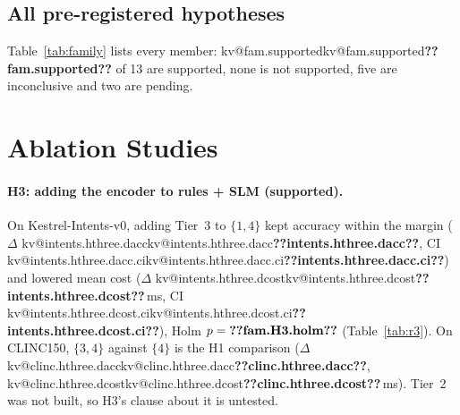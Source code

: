 \documentclass[11pt,a4paper]{article}
\makeatletter
\DeclareRobustCommand{\kv}[1]{\ifcsname kv@#1\endcsname\csname kv@#1\endcsname\else\textbf{??#1??}\fi}
\newcommand{\ms}{\,ms}
\newcommand{\tierset}[1]{$\{#1\}$}
\makeatother
\begin{document}
\subsection{All pre-registered hypotheses}

\begin{table}[t]
\centering\small
\caption{The secondary family (Holm, 13 members). H4 and H6 have not run; they enter with $p=1$ until their amendment,
so every adjustment is interim: an interim ``supported'' is final, and an interim ``inconclusive'' may still change.
H1 on CLINC150 is the primary and is tested alone.}
\label{tab:family}

\end{table}

Table~\ref{tab:family} lists every member: \kv{fam.supported} of 13 are supported, none is not supported, five are
inconclusive and two are pending.

\section{Ablation Studies}\label{sec:ablation}

\begin{table}[t]
\centering\small
\caption{Tier ablation on test (E3; Table R3); each set is tuned on validation by the same rule. On CLINC150 the rules
cannot answer, so only $\{4\}$ and $\{3,4\}$ apply. Cost is the sum of the consulted tiers' step times measured in E1,
so its p95 can differ slightly from the end-to-end latency of the same system in Table~\ref{tab:r1}.}
\label{tab:r3}

\end{table}

\paragraph{H3: adding the encoder to rules + SLM (supported).} On Kestrel-Intents-v0, adding Tier~3 to
\tierset{1,4} kept accuracy within the margin ($\Delta$ \kv{intents.hthree.dacc}, CI \kv{intents.hthree.dacc.ci})
and lowered mean cost ($\Delta$ \kv{intents.hthree.dcost}\ms, CI \kv{intents.hthree.dcost.ci}), Holm
$p=\kv{fam.H3.holm}$ (Table~\ref{tab:r3}). On CLINC150, \tierset{3,4} against \tierset{4} is the H1 comparison
($\Delta$ \kv{clinc.hthree.dacc}, \kv{clinc.hthree.dcost}\ms). Tier~2 was not built, so H3's clause about it is
untested.
\end{document}
